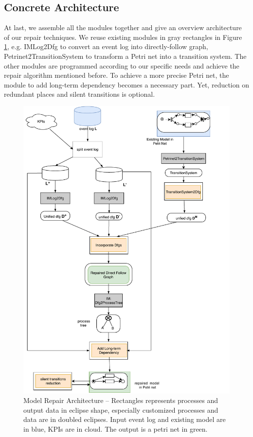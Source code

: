 \subsection{Concrete Architecture}
At last, we assemble all the modules together and give an overview architecture of our repair techniques.  We reuse existing modules in gray rectangles in Figure \ref{fig:architecture}, e.g. IMLog2Dfg to convert an event log into directly-follow graph, Petrinet2TransitionSystem to transform a Petri net into a transition system. The other modules are programmed according to our specific needs and achieve the repair algorithm mentioned before. To achieve a more precise Petri net, the module to add long-term dependency becomes a necessary part. Yet, reduction on redundant places and silent transitions is optional. 
\begin{figure}
	\includegraphics[height=0.9\textheight]{figures/algorithm/FD_architeccture_details.pdf}
	\caption[Model Repair Architecture]{Model Repair Architecture -- \small Rectangles represents processes and output data in eclipse shape, especially customized processes and data are in doubled eclipses. Input event log and existing model are in blue, KPIs are in cloud. The output is a petri net in green.}
	\label{fig:architecture}
\end{figure} 
